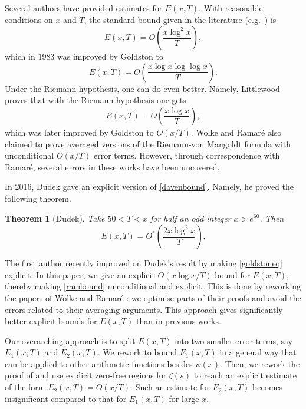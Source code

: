 \documentclass[reqno]{amsart}
\newtheorem{theorem}{Theorem}[section]
\numberwithin{equation}{section}
\theoremstyle{remark}
\begin{document}
Several authors have provided estimates for $E(x,T)$. With reasonable conditions on $x$ and $T$, the standard bound given in the literature (e.g.\ \cite[Chapter 17]{Davenport_1980}) is
\begin{equation}\label{davenbound}
    E(x,T)=O\left(\frac{x\log^2x}{T}\right),
\end{equation}
which in 1983 was improved by Goldston \cite{Goldston_83} to 
\begin{equation}\label{goldstoneq}
    E(x,T)=O\left(\frac{x\log x\log\log x}{T}\right).
\end{equation}
Under the Riemann hypothesis, one can do even better. Namely, Littlewood \cite{little1924two} proves that with the Riemann hypothesis one gets
\begin{equation}\label{rambound}
    E(x,T)=O\left(\frac{x\log x}{T}\right),
\end{equation}
which was later improved by Goldston \cite{goldston1982result} to $O(x/T)$. Wolke \cite{Wolke_1983} and Ramar\'e \cite{Ramare_16_Perron} also claimed to prove averaged versions of the Riemann-von Mangoldt formula with unconditional $O(x/T)$ error terms. However, through correspondence with Ramar\'e, several errors in these works have been uncovered.

In 2016, Dudek \cite[Theorem 1.3]{Dudek_16p} gave an explicit version of \eqref{davenbound}. Namely, he proved the following theorem.
\begin{theorem}[Dudek]\label{dudekthm}
    Take $50<T<x$ for half an odd integer $x>e^{60}$. Then
    \begin{equation*}
        E(x,T)=O^*\left(\frac{2x\log^2 x}{T}\right).
    \end{equation*}
\end{theorem}
The first author \cite[Theorem 2]{cully2023primes} recently improved on Dudek's result by making \eqref{goldstoneq} explicit. In this paper, we give an explicit $O(x\log x/T)$ bound for $E(x,T)$, thereby making \eqref{rambound} unconditional and explicit. This is done by reworking the papers of Wolke \cite{Wolke_1983} and Ramar{\'e} \cite{Ramare_16_Perron}: we optimise parts of their proofs and avoid the errors related to their averaging arguments. This approach gives significantly better explicit bounds for $E(x,T)$ than in previous works.

Our overarching approach is to split $E(x,T)$ into two smaller error terms, say $E_1(x,T)$ and $E_2(x,T)$. We rework \cite[Theorem 1.1]{Ramare_16_Perron} to bound $E_1(x,T)$ in a general way that can be applied to other arithmetic functions besides $\psi(x)$. Then, we rework the proof of \cite[Theorem 2]{Wolke_1983} and use explicit zero-free regions for $\zeta(s)$ to reach an explicit estimate of the form $E_2(x,T) = O(x/T)$. Such an estimate for $E_2(x,T)$ becomes insignificant compared to that for $E_1(x,T)$ for large $x$.
\end{document}

